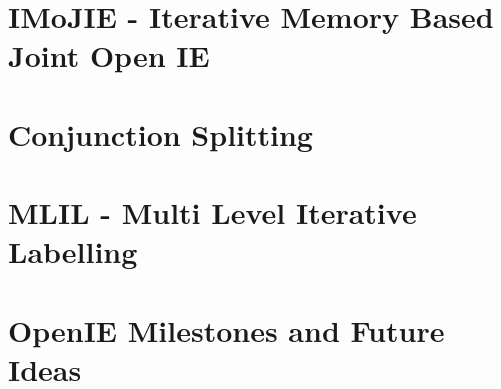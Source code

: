 \documentclass[BTech]{iitddiss}
\begin{document}

\chapter{IMoJIE - Iterative Memory Based Joint Open IE}
\label{chap:imojie}



% 


\chapter{Conjunction Splitting}
\label{chap:conjunction_splitting}



\chapter{MLIL - Multi Level Iterative Labelling}
\label{chap:mlil}



% 


\chapter{OpenIE Milestones and Future Ideas}
\label{chap:future_ideas}


\end{document}
